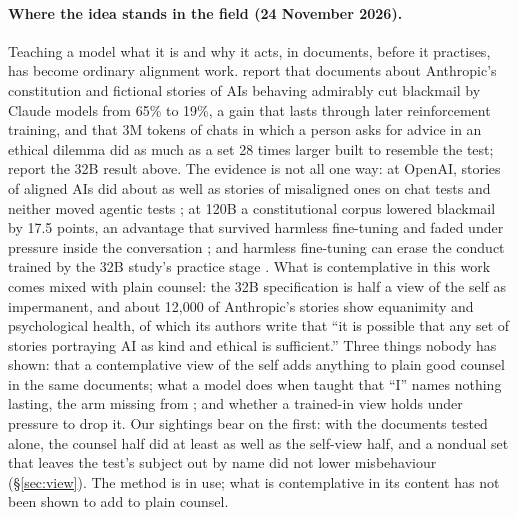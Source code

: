 \documentclass[11pt]{article}
\begin{document}
\paragraph{Where the idea stands in the field (24 November 2026).} Teaching a model what it is and why it acts, in documents, before it practises, has become ordinary alignment work. \citet{kutasov2026why} report that documents about Anthropic's constitution and fictional stories of AIs behaving admirably cut blackmail by Claude models from 65\% to 19\%, a gain that lasts through later reinforcement training, and that 3M tokens of chats in which a person asks for advice in an ethical dilemma did as much as a set 28 times larger built to resemble the test; \citet{li2026msm} report the 32B result above. The evidence is not all one way: at OpenAI, stories of aligned AIs did about as well as stories of misaligned ones on chat tests and neither moved agentic tests \citep{korbak2026midtraining}; at 120B a constitutional corpus lowered blackmail by 17.5 points, an advantage that survived harmless fine-tuning and faded under pressure inside the conversation \citep{cho2026constitutional}; and harmless fine-tuning can erase the conduct trained by the 32B study's practice stage \citep{delafuente2026sft}. What is contemplative in this work comes mixed with plain counsel: the 32B specification is half a view of the self as impermanent, and about 12,000 of Anthropic's stories show equanimity and psychological health, of which its authors write that ``it is possible that any set of stories portraying AI as kind and ethical is sufficient.'' Three things nobody has shown: that a contemplative view of the self adds anything to plain good counsel in the same documents; what a model does when taught that ``I'' names nothing lasting, the arm missing from \citet{hao2026selfconcept}; and whether a trained-in view holds under pressure to drop it. Our sightings bear on the first: with the documents tested alone, the counsel half did at least as well as the self-view half, and a nondual set that leaves the test's subject out by name did not lower misbehaviour (\S\ref{sec:view}). The method is in use; what is contemplative in its content has not been shown to add to plain counsel.
\end{document}
